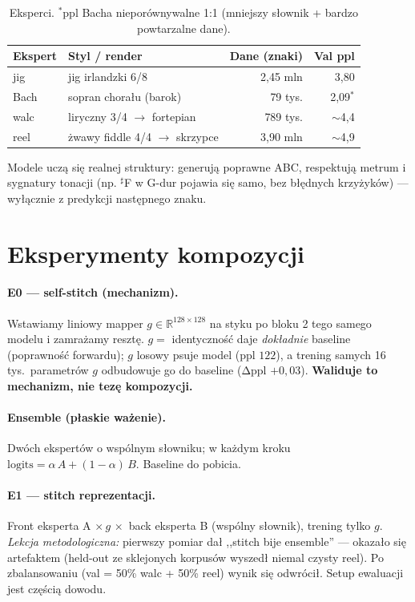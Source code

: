 \documentclass[11pt]{article}
\begin{document}
\begin{table}[h]
\centering
\begin{tabular}{llrr}
\toprule
Ekspert & Styl / render & Dane (znaki) & Val ppl \\
\midrule
jig    & jig irlandzki 6/8           & 2{,}45 mln & 3{,}80 \\
Bach   & sopran chorału (barok)      & 79 tys.    & 2{,}09$^\ast$ \\
walc   & liryczny 3/4 $\to$ fortepian & 789 tys.  & $\sim$4{,}4 \\
reel   & żwawy fiddle 4/4 $\to$ skrzypce & 3{,}90 mln & $\sim$4{,}9 \\
\bottomrule
\end{tabular}
\caption{Eksperci. $^\ast$ppl Bacha nieporównywalne 1:1 (mniejszy słownik + bardzo powtarzalne dane).}
\end{table}

Modele uczą się realnej struktury: generują poprawne ABC, respektują metrum i sygnatury tonacji (np. $^\sharp$F
w G-dur pojawia się samo, bez błędnych krzyżyków) --- wyłącznie z predykcji następnego znaku.

\section{Eksperymenty kompozycji}
\paragraph{E0 --- self-stitch (mechanizm).} Wstawiamy liniowy mapper $g\in\mathbb{R}^{128\times128}$ na styku po
bloku 2 tego samego modelu i zamrażamy resztę. $g=$ identyczność daje \emph{dokładnie} baseline (poprawność
forwardu); $g$ losowy psuje model (ppl $122$), a trening samych 16 tys.\ parametrów $g$ odbudowuje go do
baseline (Δppl $+0{,}03$). \textbf{Waliduje to mechanizm, nie tezę kompozycji.}

\paragraph{Ensemble (płaskie ważenie).} Dwóch ekspertów o wspólnym słowniku; w każdym kroku
$\text{logits}=\alpha\,A + (1-\alpha)\,B$. Baseline do pobicia.

\paragraph{E1 --- stitch reprezentacji.} Front eksperta A $\times\, g \,\times$ back eksperta B (wspólny słownik),
trening tylko $g$. \emph{Lekcja metodologiczna:} pierwszy pomiar dał ,,stitch bije ensemble'' --- okazało się
artefaktem (held-out ze sklejonych korpusów wyszedł niemal czysty reel). Po zbalansowaniu (val = 50\% walc +
50\% reel) wynik się odwrócił. Setup ewaluacji jest częścią dowodu.
\end{document}
